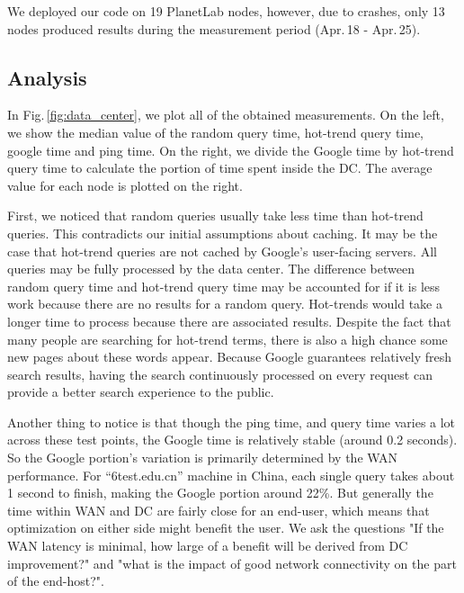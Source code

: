 We deployed our code on 19 PlanetLab nodes, however, due to crashes, only 13 nodes produced results during the measurement period (Apr.\,18 - Apr.\,25).

\subsection{Analysis}
\label{sec:analysis}

In Fig.\,\ref{fig:data_center}, we plot all of the obtained measurements. On the left, we show the median value of the random query time, hot-trend query time, google time and ping time. On the right, we divide the Google time by hot-trend query time to calculate the portion of time spent inside the DC. The average value for each node is plotted on the right.

First, we noticed that random queries usually take less time than hot-trend queries. This contradicts our initial assumptions about caching. It may be the case that hot-trend queries are not cached by Google's user-facing servers. All queries may be fully processed by the data center. The difference between random query time and hot-trend query time may be accounted for if it is less work because there are no results for a random query. Hot-trends would take a longer time to process because there are associated results.  Despite the fact that many people are searching for hot-trend terms, there is also a high chance some new pages about these words appear. Because Google guarantees relatively fresh search results, having the search continuously processed on every request can provide a better search experience to the public.

Another thing to notice is that though the ping time, and query time varies a lot across these test points, the Google time is relatively stable (around 0.2 seconds). So the Google portion's variation is primarily determined by the WAN performance. For ``6test.edu.cn'' machine in China, each single query takes about 1 second to finish, making the Google portion around 22\%. But generally the time within WAN and DC are fairly close for an end-user, which means that optimization on either side might benefit the user. We ask the questions "If the WAN latency is minimal, how large of a benefit will be derived from DC improvement?" and "what is the impact of good network connectivity on the part of the end-host?".

